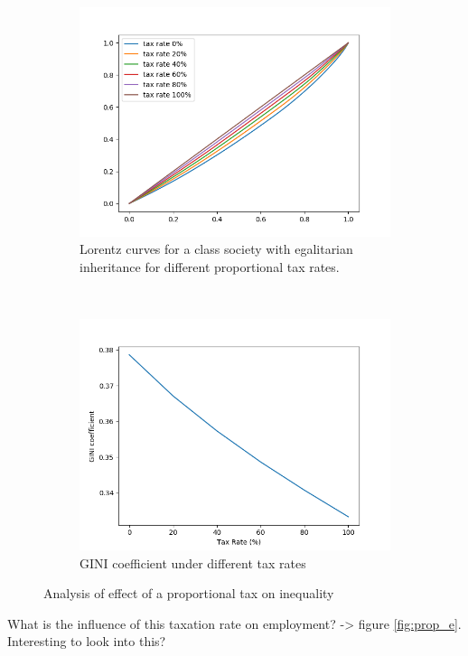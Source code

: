 \begin{figure}
\begin{subfigure}{\textwidth}
  \centering
    \includegraphics[width=0.9\linewidth]{Results/images/Figure_1.png}
    \caption{Lorentz curves for a class society with egalitarian inheritance for different proportional tax rates.}
    \label{fig:prop_tax}
\end{subfigure}\\
\begin{subfigure}{\textwidth}
  \centering
  \includegraphics[width=.8\linewidth]{Results/images/GINI_prop.png}
  \caption{GINI coefficient under different tax rates}
  \label{fig:prop_gini}
\end{subfigure}
\caption{Analysis of effect of a proportional tax on inequality}
\label{fig:fig1}
\end{figure}

What is the influence of this taxation rate on employment? -> figure \ref{fig:prop_e}. Interesting to look into this?

